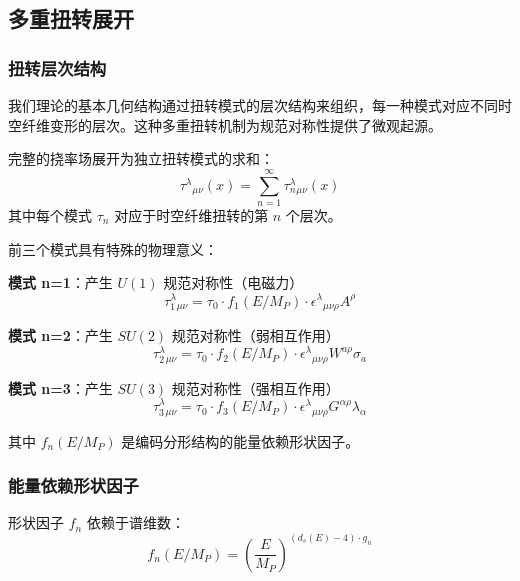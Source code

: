 \subsection{多重扭转展开}
\label{sec:multiple_twisting}

\subsubsection{扭转层次结构}

我们理论的基本几何结构通过扭转模式的层次结构来组织，每一种模式对应不同时空纤维变形的层次。这种多重扭转机制为规范对称性提供了微观起源。

\begin{definition}[多重扭转场]
完整的挠率场展开为独立扭转模式的求和：
\begin{equation}
    \tau^{\lambda}{}_{\mu\nu}(x) = \sum_{n=1}^{\infty} \tau_n^{\lambda}{}_{\mu\nu}(x)
\end{equation}
其中每个模式 $\tau_n$ 对应于时空纤维扭转的第 $n$ 个层次。
\end{definition}

前三个模式具有特殊的物理意义：

\textbf{模式 n=1}：产生 $U(1)$ 规范对称性（电磁力）
\begin{equation}
    \tau_1^{\lambda}{}_{\mu\nu} = \tau_0 \cdot f_1(E/M_P) \cdot \epsilon^{\lambda}{}_{\mu\nu\rho} A^{\rho}
\end{equation}

\textbf{模式 n=2}：产生 $SU(2)$ 规范对称性（弱相互作用）
\begin{equation}
    \tau_2^{\lambda}{}_{\mu\nu} = \tau_0 \cdot f_2(E/M_P) \cdot \epsilon^{\lambda}{}_{\mu\nu\rho} W^{a\rho} \sigma_a
\end{equation}

\textbf{模式 n=3}：产生 $SU(3)$ 规范对称性（强相互作用）
\begin{equation}
    \tau_3^{\lambda}{}_{\mu\nu} = \tau_0 \cdot f_3(E/M_P) \cdot \epsilon^{\lambda}{}_{\mu\nu\rho} G^{\alpha\rho} \lambda_{\alpha}
\end{equation}

其中 $f_n(E/M_P)$ 是编码分形结构的能量依赖形状因子。

\subsubsection{能量依赖形状因子}

形状因子 $f_n$ 依赖于谱维数：
\begin{equation}
    f_n(E/M_P) = \left(\frac{E}{M_P}\right)^{(d_s(E) - 4) \cdot g_n}
\end{equation}

